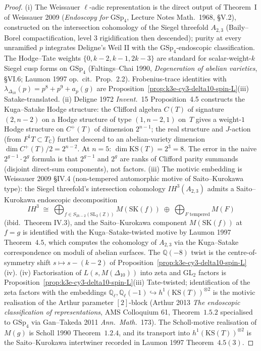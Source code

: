 \begin{proof}
\textup{(i)} The Weissauer $\ell$-adic representation is the direct output of Theorem~I of Weissauer 2009 (\emph{Endoscopy for} $\mathrm{GSp}_4$, Lecture Notes Math.\ 1968, \S V.2), constructed on the intersection cohomology of the Siegel threefold $A_{2,3}$ (Baily--Borel compactification, level $3$ rigidification then descended); purity at every unramified $p$ integrates Deligne's Weil II with the $\mathrm{GSp}_4$-endoscopic classification. The Hodge--Tate weights $\{0, k-2, k-1, 2k-3\}$ are standard for scalar-weight-$k$ Siegel cusp forms on $\mathrm{GSp}_4$ (Faltings--Chai 1990, \emph{Degeneration of abelian varieties}, \S VI.6; Laumon 1997 op.\ cit.\ Prop.\ 2.2). Frobenius-trace identities with $\lambda_{\Delta_{10}}(p) = p^8 + p^9 + a_p(g)$ are Proposition~\ref{prop:k3e-cy3-delta10-spin-L}(iii) Satake-translated.
\textup{(ii)} Deligne 1972 \emph{Invent.}\ 15 Proposition~4.5 constructs the Kuga--Satake Hodge structure: the Clifford algebra $C(T)$ of signature $(2, n-2)$ on a Hodge structure of type $(1, n-2, 1)$ on~$T$ gives a weight-$1$ Hodge structure on $C^+(T)$ of dimension $2^{n-1}$; the real structure and $J$-action (from $F^1 T \subset T_{\mathbb C}$) further descend to an abelian-variety dimension $\dim C^+(T)/2 = 2^{n-2}$. At $n = 5$: $\dim \mathrm{KS}(T) = 2^3 = 8$. The error in the naive $2^{g-1} \cdot 2^g$ formula is that $2^{g-1}$ and $2^g$ are ranks of Clifford parity summands (disjoint direct-sum components), not factors.
\textup{(iii)} The motivic embedding is Weissauer 2009 \S IV.4 (non-tempered automorphic motive of Saito--Kurokawa type): the Siegel threefold's intersection cohomology $IH^3(A_{2,3})$ admits a Saito--Kurokawa endoscopic decomposition
\[ IH^3 \;\cong\; \bigoplus_{f \in S_{2k-2}(\mathrm{SL}_2(\mathbb Z))} M(\mathrm{SK}(f)) \;\oplus\; \bigoplus_{F \text{ tempered}} M(F) \]
(ibid.\ Theorem IV.3), and the Saito--Kurokawa component $M(\mathrm{SK}(f))$ at $f = g$ is identified with the Kuga--Satake-twisted motive by Laumon 1997 Theorem~$4.5$, which computes the cohomology of $A_{2,3}$ via the Kuga--Satake correspondence on moduli of abelian surfaces. The $\mathbb Q(-8)$ twist is the centre-of-symmetry shift $s \mapsto s - (k-2)$ of Proposition~\ref{prop:k3e-cy3-delta10-spin-L}(iv).
\textup{(iv)} Factorisation of $L(s, M(\Delta_{10}))$ into zeta and GL$_2$ factors is Proposition~\ref{prop:k3e-cy3-delta10-spin-L}(iii) Tate-twisted; identification of the zeta factors with the embeddings $\mathbb Q_\ell, \mathbb Q_\ell(-1) \hookrightarrow h^1(\mathrm{KS}(T))^{\otimes 2}$ is the motivic realisation of the Arthur parameter $[2]$-block (Arthur 2013 \emph{The endoscopic classification of representations}, AMS Colloquium 61, Theorem~$1.5.2$ specialised to $\mathrm{GSp}_4$ via Gan--Takeda 2011 \emph{Ann.\ Math.}\ 173). The Scholl-motive realisation of $M(g)$ is Scholl 1990 Theorem~$1.2.4$, and its transport into $h^1(\mathrm{KS}(T))^{\otimes 2}$ is the Saito--Kurokawa intertwiner recorded in Laumon 1997 Theorem~$4.5(3)$.
\end{proof}

